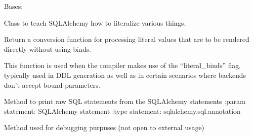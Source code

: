 \begin{fulllineitems}
\label{\detokenize{eboa.engine:eboa.engine.printing.StringLiteral}}
Bases: 

Class to teach SQLAlchemy how to literalize various things.

\begin{fulllineitems}
\label{\detokenize{eboa.engine:eboa.engine.printing.StringLiteral.literal_processor}}
Return a conversion function for processing literal values that are
to be rendered directly without using binds.

This function is used when the compiler makes use of the
“literal\_binds” flag, typically used in DDL generation as well
as in certain scenarios where backends don’t accept bound parameters.


\end{fulllineitems}


\end{fulllineitems}


\begin{fulllineitems}
\label{\detokenize{eboa.engine:eboa.engine.printing.literal_query}}
Method to print raw SQL statements from the SQLAlchemy statements
:param statement: SQLAlchemy statement
:type statement: sqlalchemy.sql.annotation

Method used for debugging purpuses (not open to external usage)

\end{fulllineitems}



